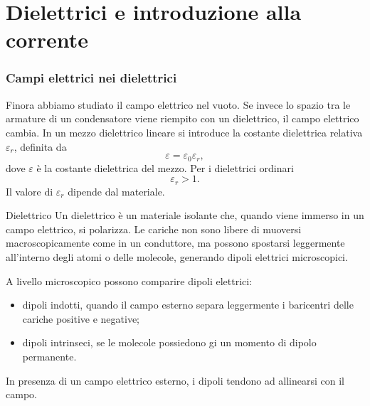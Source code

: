 \documentclass[a4paper]{article}
\begin{document}
\pagebreak
\part{Dielettrici e introduzione alla corrente}

\section{Campi elettrici nei dielettrici}

Finora abbiamo studiato il campo elettrico nel vuoto. Se invece lo spazio tra le armature di un condensatore viene riempito con un dielettrico, il campo elettrico cambia. In un mezzo dielettrico lineare si introduce la costante dielettrica relativa \(\varepsilon_r\), definita da
\[
    \varepsilon=\varepsilon_0\varepsilon_r,
\]
dove \(\varepsilon\) è la costante dielettrica del mezzo. Per i dielettrici ordinari
\[
    \varepsilon_r>1.
\]
Il valore di \(\varepsilon_r\) dipende dal materiale.

\begin{snippetdefinition}{Dielettrico}
    Un dielettrico è un materiale isolante che, quando viene immerso in un campo elettrico, si polarizza. Le cariche non sono libere di muoversi macroscopicamente come in un conduttore, ma possono spostarsi leggermente all'interno degli atomi o delle molecole, generando dipoli elettrici microscopici.
\end{snippetdefinition}

A livello microscopico possono comparire dipoli elettrici:
\begin{itemize}
    \item dipoli indotti, quando il campo esterno separa leggermente i baricentri delle cariche positive e negative;
    \item dipoli intrinseci, se le molecole possiedono gi un momento di dipolo permanente.
\end{itemize}
In presenza di un campo elettrico esterno, i dipoli tendono ad allinearsi con il campo.

\begin{center}
\end{center}
\end{document}
